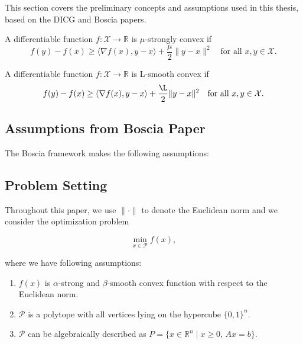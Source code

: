 

This section covers the preliminary concepts and assumptions used in this thesis, based on the DICG and Boscia papers.

\begin{definition}
	A differentiable function \( f : \mathcal{X} \to \mathbb{R} \) is \( \mu\)-strongly convex if 
	\[
	f(y) - f(x) \geq \langle \nabla f(x), y - x \rangle + \frac{\mu}{2} \| y - x \|^2 \quad \text{for all } x, y \in \mathcal{X}.
	\]
\end{definition}

\begin{definition}
	A differentiable function \( f : \mathcal{X} \to \mathbb{R} \) is  L-smooth convex if 
	\[
	f(y) - f(x) \geq \langle \nabla f(x), y - x \rangle + \frac{\L}{2} \| y - x \|^2 \quad \text{for all } x, y \in \mathcal{X}.
	\]
\end{definition}

\subsection{Assumptions from Boscia Paper}
The Boscia framework makes the following assumptions:



\subsection{Problem Setting}
Throughout this paper, we use \( \| \cdot \| \) to denote the Euclidean norm and we consider the optimization problem

\[
\min_{x \in \mathcal{P}} f(x),
\]

where we have following assumptions:\
\begin{enumerate}
	\item \(f(x)\) is \(\alpha\)-strong and \(\beta\)-smooth convex function with respect to the Euclidean norm.
	\item \(\mathcal{P}\) is a polytope with all vertices lying on the hypercube \( \{0, 1\}^n \).
	\item \(\mathcal{P}\) can be algebraically described as \(P = \{ x \in \mathbb{R}^n \mid x \geq 0, \, Ax = b \}. \)
\end{enumerate}

